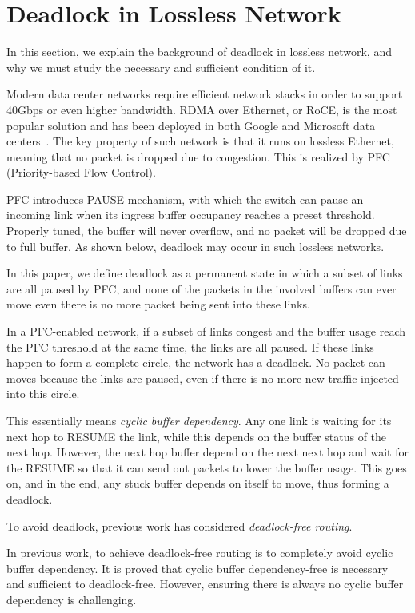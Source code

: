 \section{Deadlock in Lossless Network}

In this section, we explain the background of deadlock in lossless network, and 
why we must study the necessary and sufficient condition of it.

Modern data center networks require efficient network stacks in order to support 
40Gbps or even higher bandwidth. RDMA over Ethernet, or RoCE, is the most popular
solution and has been deployed in both Google and Microsoft data centers~\cite{dcqcn, timely}.
The key property of such network is that it runs on lossless Ethernet, meaning
that no packet is dropped due to congestion. This is realized by PFC 
(Priority-based Flow Control).

PFC introduces PAUSE mechanism, with which the switch can pause an incoming link
when its ingress buffer occupancy reaches a preset threshold. Properly tuned, the 
buffer will never overflow, and no packet will be dropped due to full buffer.
As shown below, deadlock may occur in such lossless networks.


In this paper, we define deadlock as a permanent state in which a subset of links are all paused
by PFC, and none of the packets in the involved buffers can ever move even there is 
no more packet being sent into these links.

In a PFC-enabled network, if a subset of links congest and the buffer usage reach
the PFC threshold at the same time, the links are all paused. If these links happen
to form a complete circle, the network has a deadlock. No packet can moves because 
the links are paused, even if there is no more new traffic injected into this circle.

This essentially means {\em cyclic buffer dependency}. Any one link is waiting for its next
hop to RESUME the link, while this depends on the buffer status of the next hop. However,
the next hop buffer depend on the next next hop and wait for the RESUME
so that it can send out packets to lower the buffer usage. This goes on, and in the end, 
any stuck buffer depends on itself to move, thus forming a deadlock.

To avoid deadlock, previous work has considered {\em deadlock-free routing}.

In previous work, to achieve deadlock-free routing is to completely avoid cyclic buffer dependency.
It is proved that cyclic buffer dependency-free is necessary and sufficient to deadlock-free.
However, ensuring there is always no cyclic buffer dependency is challenging.

